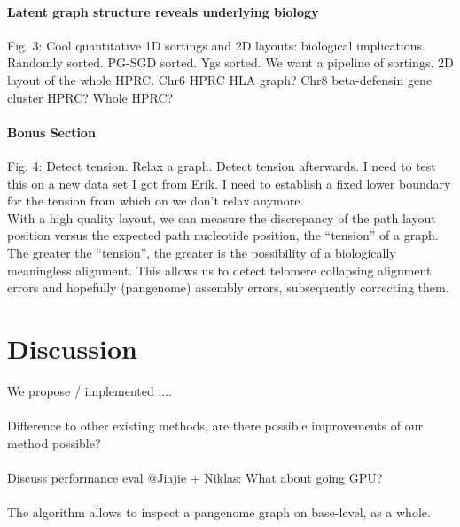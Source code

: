 \documentclass[11pt,hidelinks]{article}
\begin{document}
\paragraph{Latent graph structure reveals underlying biology}
Fig. 3: Cool quantitative 1D sortings and 2D layouts: biological implications. Randomly sorted. PG-SGD sorted. Ygs sorted. We want a pipeline of sortings. 2D layout of the whole HPRC. Chr6 HPRC HLA graph? Chr8 beta-defensin gene cluster HPRC? Whole HPRC?
\paragraph{Bonus Section}
Fig. 4: Detect tension. Relax a graph. Detect tension afterwards. I need to test this on a new data set I got from Erik. I need to establish a fixed lower boundary for the tension from which on we don't relax anymore. \\
With a high quality layout, we can measure the discrepancy of the path layout position versus the expected path nucleotide position, the “tension” of a graph. The greater the “tension”, the greater is the possibility of a biologically meaningless alignment. This allows us to detect telomere collapsing alignment errors and hopefully (pangenome) assembly errors, subsequently correcting them.

\section{Discussion}

We propose / implemented ....
\paragraph{}
Difference to other existing methods, are there possible improvements of our method possible?
\paragraph{}
Discuss performance eval
@Jiajie + Niklas: What about going GPU?
\paragraph{}
The algorithm allows to inspect a pangenome graph on base-level, as a whole.
\end{document}
